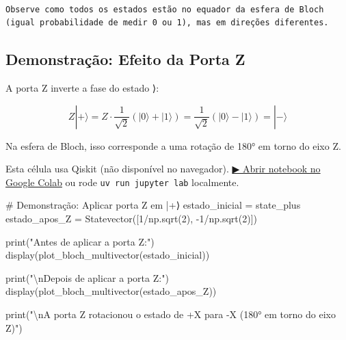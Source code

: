 \documentclass[
  brazilian,
]{report}
\newenvironment{Shaded}{\begin{snugshade}}{\end{snugshade}}
\newcommand{\BuiltInTok}[1]{\textcolor[rgb]{0.00,0.23,0.31}{#1}}
\newcommand{\CharTok}[1]{\textcolor[rgb]{0.13,0.47,0.30}{#1}}
\newcommand{\CommentTok}[1]{\textcolor[rgb]{0.37,0.37,0.37}{#1}}
\newcommand{\DecValTok}[1]{\textcolor[rgb]{0.68,0.00,0.00}{#1}}
\newcommand{\NormalTok}[1]{\textcolor[rgb]{0.00,0.23,0.31}{#1}}
\newcommand{\OperatorTok}[1]{\textcolor[rgb]{0.37,0.37,0.37}{#1}}
\newcommand{\StringTok}[1]{\textcolor[rgb]{0.13,0.47,0.30}{#1}}
\begin{document}
\begin{verbatim}

Observe como todos os estados estão no equador da esfera de Bloch
(igual probabilidade de medir 0 ou 1), mas em direções diferentes.
\end{verbatim}

\subsection{Demonstração: Efeito da Porta
Z}\label{demonstrauxe7uxe3o-efeito-da-porta-z}

A porta Z inverte a fase do estado ⟩:

\[Z|+⟩ = Z · \frac{1}{\sqrt{2}}(|0⟩ + |1⟩) = \frac{1}{\sqrt{2}}(|0⟩ - |1⟩) = |-⟩\]

Na esfera de Bloch, isso corresponde a uma rotação de 180° em torno do
eixo Z.

\begin{tcolorbox}[enhanced jigsaw, arc=.35mm, bottomrule=.15mm, bottomtitle=1mm, breakable, colback=white, colbacktitle=quarto-callout-warning-color!10!white, colframe=quarto-callout-warning-color-frame, coltitle=black, left=2mm, leftrule=.75mm, opacityback=0, opacitybacktitle=0.6, rightrule=.15mm, title=\textcolor{quarto-callout-warning-color}{\faExclamationTriangle}\hspace{0.5em}{⚛️ Célula Qiskit --- execute no Colab ou localmente}, titlerule=0mm, toprule=.15mm, toptitle=1mm]

Esta célula usa Qiskit (não disponível no navegador).
\href{https://colab.research.google.com/github/maxwellamaral/aula-quantum/blob/main/notebooks/00b-phases.ipynb}{▶
Abrir notebook no Google Colab} ou rode \texttt{uv\ run\ jupyter\ lab}
localmente.

\begin{Shaded}
\begin{Highlighting}[]

\CommentTok{\# Demonstração: Aplicar porta Z em |+⟩}
\NormalTok{estado\_inicial }\OperatorTok{=}\NormalTok{ state\_plus}
\NormalTok{estado\_apos\_Z }\OperatorTok{=}\NormalTok{ Statevector([}\DecValTok{1}\OperatorTok{/}\NormalTok{np.sqrt(}\DecValTok{2}\NormalTok{), }\OperatorTok{{-}}\DecValTok{1}\OperatorTok{/}\NormalTok{np.sqrt(}\DecValTok{2}\NormalTok{)])}

\BuiltInTok{print}\NormalTok{(}\StringTok{"Antes de aplicar a porta Z:"}\NormalTok{)}
\NormalTok{display(plot\_bloch\_multivector(estado\_inicial))}

\BuiltInTok{print}\NormalTok{(}\StringTok{"}\CharTok{\textbackslash{}n}\StringTok{Depois de aplicar a porta Z:"}\NormalTok{)}
\NormalTok{display(plot\_bloch\_multivector(estado\_apos\_Z))}

\BuiltInTok{print}\NormalTok{(}\StringTok{"}\CharTok{\textbackslash{}n}\StringTok{A porta Z rotacionou o estado de +X para {-}X (180° em torno do eixo Z)"}\NormalTok{)}
\end{Highlighting}
\end{Shaded}

\end{tcolorbox}
\end{document}
